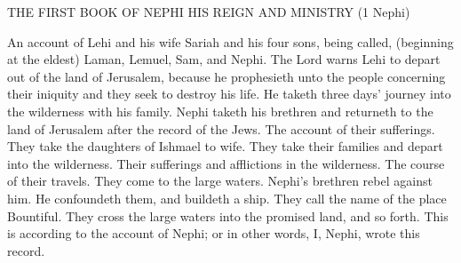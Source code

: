 THE FIRST BOOK OF NEPHI HIS REIGN AND MINISTRY (1 Nephi)

An account of Lehi and his wife Sariah and his four sons, being called, (beginning at the eldest) Laman, Lemuel, Sam, and Nephi.  The Lord warns Lehi to depart out of the land of Jerusalem, because he prophesieth unto the people concerning their iniquity and they seek to destroy his life. He taketh three days' journey into the wilderness with his family. Nephi taketh his brethren and returneth to the land of Jerusalem after the record of the Jews. The account of their sufferings. They take the daughters of Ishmael to wife. They take their families and depart into the wilderness. Their sufferings and afflictions in the wilderness.  The course of their travels. They come to the large waters.  Nephi's brethren rebel against him. He confoundeth them, and buildeth a ship. They call the name of the place Bountiful. They cross the large waters into the promised land, and so forth. This is according to the account of Nephi; or in other words, I, Nephi, wrote this record.

